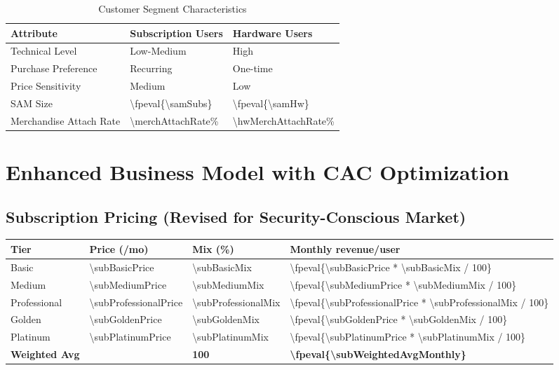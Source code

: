 \documentclass[11pt]{article}
\newcommand{\numfpeval}[1]{\num{\fpeval{#1}}}
\newcommand{\numint}[1]{\num[round-precision=0]{\fpeval{#1}}}
\begin{document}
\begin{table}[H]
\centering
\caption{Customer Segment Characteristics}
\begin{tabularx}{\linewidth}{l X X}
\toprule
Attribute & Subscription Users & Hardware Users \\\midrule
Technical Level & Low-Medium & High \\
Purchase Preference & Recurring & One-time \\
Price Sensitivity & Medium & Low \\
SAM Size & \numint{\samSubs}\cite{chainalysis2024,triple2023} & \numint{\samHw}\cite{chainalysis2024,triple2023} \\
Merchandise Attach Rate & \num{\merchAttachRate}\%\cite{shopify2024} & \num{\hwMerchAttachRate}\%\cite{shopify2024} \\
\bottomrule
\end{tabularx}
\end{table}

\section{Enhanced Business Model with CAC Optimization}

\subsection{Subscription Pricing (Revised for Security-Conscious Market)}
\begin{table}[H]
\centering
\begin{tabularx}{\linewidth}{l Y Y Y}
\toprule
Tier & Price (/mo) & Mix (\%) & Monthly revenue/user \\\midrule
Basic   & \num{\subBasicPrice}  & \num{\subBasicMix} & \numfpeval{\subBasicPrice * \subBasicMix / 100} \\
Medium  & \num{\subMediumPrice} & \num{\subMediumMix} & \numfpeval{\subMediumPrice * \subMediumMix / 100} \\
Professional & \num{\subProfessionalPrice} & \num{\subProfessionalMix} & \numfpeval{\subProfessionalPrice * \subProfessionalMix / 100} \\
Golden  & \num{\subGoldenPrice} & \num{\subGoldenMix} & \numfpeval{\subGoldenPrice * \subGoldenMix / 100} \\
Platinum & \num{\subPlatinumPrice} & \num{\subPlatinumMix} & \numfpeval{\subPlatinumPrice * \subPlatinumMix / 100} \\\midrule
\textbf{Weighted Avg} &  & \textbf{\num{100}} & \textbf{\numfpeval{\subWeightedAvgMonthly}} \\
\bottomrule
\end{tabularx}
\end{table}
\end{document}

